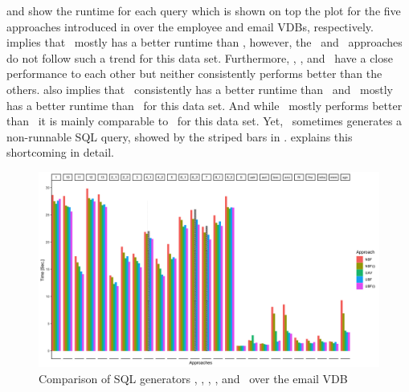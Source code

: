  and  show the runtime for each query which is shown on top the plot
for the five approaches introduced in  over the employee and email VDBs, respectively.
%
 implies that  \nbfi\ mostly has a better
runtime than \nbf, however, the \ubf\ and \ubfi\ approaches do not follow such a trend for this data set. 
Furthermore, 
\nbfi, \uav, and \ubf\ have a close performance to each other but neither consistently performs 
better than the others. 
%
%
 also implies that \nbfi\ consistently has a better
runtime than \nbf\ and \ubfi\ mostly has a better runtime than \ubf\ for this data set. And while
\uav\ mostly performs better than \nbfi\ it is mainly comparable to \ubfi\ for this data set. Yet, \uav\
sometimes generates a non-runnable SQL query, showed by the striped bars in .
\exref{uav-fail} explains this shortcoming in detail. 


\begin{figure}[!t]
\centering
\includegraphics[width = \linewidth] {figs/plots/enron1-5.png}
\caption[Comparison of SQL generators \nbf, \nbfi, \uav, \ubf, and \ubfi\ over the email VDB]{Comparison of SQL generators \nbf, \nbfi, \uav, \ubf, and \ubfi\ over the email VDB}
\label{fig:enron1-5}
\end{figure}



